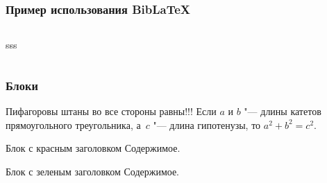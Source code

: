\documentclass[aspectratio=169]{beamer}
\begin{document}
\begin{frame}
\frametitle{Пример использования BibLaTeX}
\medskip
\begin{columns}
sss
\end{columns}
\end{frame}

\begin{frame}
\frametitle{Блоки}
	\begin{theorem}[Пифагора]
		Пифагоровы штаны во все стороны равны!!!
		Если $a$ и $b$ "--- длины катетов прямоугольного треугольника, а~$c$ "--- длина гипотенузы, то $a^2+b^2=c^2$.
	\end{theorem}

	\begin{alertblock}{Блок с красным заголовком}
		Содержимое.
	\end{alertblock}

	\begin{exampleblock}{Блок с зеленым заголовком}
		Содержимое.
	\end{exampleblock}
\end{frame}
\end{document}
